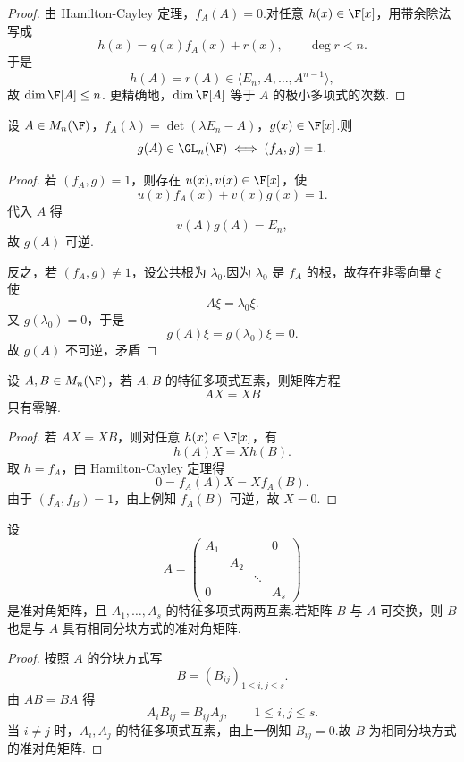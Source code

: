\begin{proof}
由 Hamilton-Cayley 定理，$f_A(A)=0$.对任意 $h(x)\in\F[x]$，用带余除法写成
\[
h(x)=q(x)f_A(x)+r(x),
\qquad \deg r<n.
\]
于是
\[
h(A)=r(A)\in\langle E_n,A,\ldots,A^{n-1}\rangle,
\]
故 $\dim\F[A]\leq n$.
更精确地，$\dim\F[A]$ 等于 $A$ 的极小多项式的次数.
\end{proof}




\begin{example}
设 $A\in M_n(\F)$，$f_A(\lambda)=\det(\lambda E_n-A)$，$g(x)\in\F[x]$.则
\[
g(A)\in \GL_n(\F)
\iff
(f_A,g)=1.
\]
\end{example}

\begin{proof}
若 $(f_A,g)=1$，则存在 $u(x),v(x)\in\F[x]$，使
\[
u(x)f_A(x)+v(x)g(x)=1.
\]
代入 $A$ 得
\[
v(A)g(A)=E_n,
\]
故 $g(A)$ 可逆.

反之，若 $(f_A,g)\neq1$，设公共根为 $\lambda_0$.因为 $\lambda_0$ 是 $f_A$ 的根，故存在非零向量 $\xi$ 使
\[
A\xi=\lambda_0\xi.
\]
又 $g(\lambda_0)=0$，于是
\[
g(A)\xi=g(\lambda_0)\xi=0.
\]
故 $g(A)$ 不可逆，矛盾
\end{proof}

\begin{example}
设 $A,B\in M_n(\F)$，若 $A,B$ 的特征多项式互素，则矩阵方程
\[
AX=XB
\]
只有零解.
\end{example}

\begin{proof}
若 $AX=XB$，则对任意 $h(x)\in\F[x]$，有
\[
h(A)X=Xh(B).
\]
取 $h=f_A$，由 Hamilton-Cayley 定理得
\[
0=f_A(A)X=Xf_A(B).
\]
由于 $(f_A,f_B)=1$，由上例知 $f_A(B)$ 可逆，故 $X=0$.
\end{proof}

\begin{example}
设
\[
A=\begin{pmatrix}
A_1&&&0\\
&A_2&&\\
&&\ddots&\\
0&&&A_s
\end{pmatrix}
\]
是准对角矩阵，且 $A_1,\ldots,A_s$ 的特征多项式两两互素.若矩阵 $B$ 与 $A$ 可交换，则 $B$ 也是与 $A$ 具有相同分块方式的准对角矩阵.
\end{example}

\begin{proof}
按照 $A$ 的分块方式写
\[
B=(B_{ij})_{1\leq i,j\leq s}.
\]
由 $AB=BA$ 得
\[
A_iB_{ij}=B_{ij}A_j,
\qquad 1\leq i,j\leq s.
\]
当 $i\neq j$ 时，$A_i,A_j$ 的特征多项式互素，由上一例知 $B_{ij}=0$.故 $B$ 为相同分块方式的准对角矩阵.
\end{proof}

